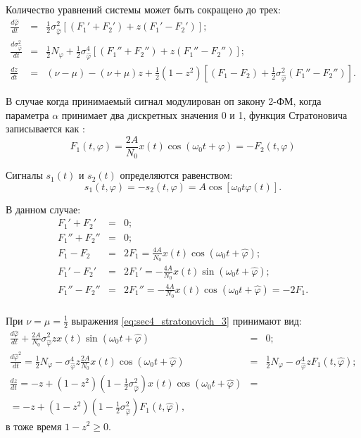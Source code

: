 Количество уравнений системы может быть сокращено до трех:
\begin{eqnarray}
	\frac{d \hat{\varphi}}{dt} & = & \frac{1}{2}\sigma_{\hat{\varphi}}^2 \left[(F_{1}' + F_{2}') + z(F_{1}' - F_{2}') \right]; \nonumber \\
	\frac{d \sigma_{\hat{\varphi}}^2}{dt} & = & \frac{1}{2}N_{\varphi} + \frac{1}{2}\sigma_{\hat{\varphi}}^4 \left[ (F_{1}'' + F_{2}'') +  z(F_{1}'' - F_{2}'') \right]; \\
	\frac{dz}{dt} & = & (\nu - \mu) - (\nu + \mu)z + \frac{1}{2}(1 - z^2) \left[ (F_{1} - F_{2}) +  \frac{1}{2} \sigma_{\hat{\varphi}}^2 (F_{1}'' - F_{2}'') \right]. \nonumber
	\label{eq:sec4_stratonovich_3}
\end{eqnarray}

В случае когда принимаемый сигнал модулирован оп закону 2-ФМ, когда параметра ${\alpha}$ принимает два дискретных значения 0 и 1,
функция Стратоновича записывается как \cite{shahtarin-wiener-kalman}:
\begin{equation}
	F_1(t, \varphi) = \frac{2A}{N_0}x(t) \cos (\omega_0 t + \varphi) = -F_2(t, \varphi)
	\label{eq:sec4_stratonovich_bpsk}
\end{equation}

Сигналы ${s_1(t)}$ и ${s_2(t)}$ определяются равенством: 
\begin{equation}
	s_1(t, \varphi) = -s_2(t, \varphi) = A \cos \left[ \omega_0 t \varphi(t) \right].
	\label{eq:sec4_s1_s2}
\end{equation}

В данном случае:
\begin{eqnarray}
	F_1' + F_2' & = & 0; \nonumber \\
	F_1'' + F_2'' & = & 0; \nonumber \\
	F_1 - F_2 & = & 2F_1 = \frac{4A}{N_0}x(t) \cos(\omega_0 t + \hat{\varphi}); \nonumber \\
	F_1' - F_2' & = & 2F_1' = -\frac{4A}{N_0}x(t) \sin(\omega_0 t + \hat{\varphi}); \nonumber \\
	F_1'' - F_2'' & = & 2F_1'' = -\frac{4A}{N_0}x(t) \cos(\omega_0 t + \hat{\varphi}) = -2F_1. \nonumber \\
	\label{eq:sec4_strat_der}
\end{eqnarray}

При ${\nu = \mu = \frac{1}{2}}$ выражения \ref{eq:sec4_stratonovich_3} принимают вид:
\begin{eqnarray}
	\frac{d \hat{\varphi}}{dt} + \frac{2A}{N_0} \sigma_{\hat{\varphi}}^2 z x(t) \sin (\omega_0 t + \hat{\varphi}) & = & 0; \nonumber \\
	\frac{d \hat{\varphi}^2}{dt} = \frac{1}{2} N_{\varphi} - \sigma_{\hat{\varphi}}^4 z \frac{2A}{N_0} x(t) \cos(\omega_0 t + \hat{\varphi}) & = & \frac{1}{2}N_{\varphi} - \sigma_{\hat{\varphi}}^4 zF_1(t, \hat{\varphi}); \nonumber \\
	\frac{dz}{dt} = -z + (1 - z^2) \left( 1 - \frac{1}{2} \sigma_{\hat{\varphi}}^2 \right) x(t) \cos(\omega_0 t + \hat{\varphi}) & = & \nonumber \\
		 = -z + (1 - z^2) \left( 1 - \frac{1}{2} \sigma_{\hat{\varphi}}^2 \right) F_1(t, \hat{\varphi}), & &
	\label{eq:sec4_strat_der111}
\end{eqnarray}
в тоже время ${1 - z^2 \ge 0}$.


